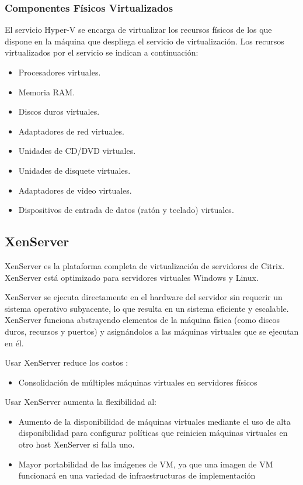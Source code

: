 \documentclass[preprint,12pt]{elsarticle}
\begin{document}
\subsubsection{\textbf{Componentes Físicos Virtualizados}}
El servicio Hyper-V se encarga de virtualizar los recursos físicos de los que dispone en la máquina que despliega
el servicio de virtualización.
Los recursos virtualizados por el servicio se indican a continuación:
\begin{itemize}
\item Procesadores virtuales.
\item Memoria RAM.
\item Discos duros virtuales.
\item Adaptadores de red virtuales.
\item Unidades de CD/DVD virtuales.
\item Unidades de disquete virtuales.
\item Adaptadores de video virtuales.
\item Dispositivos de entrada de datos (ratón y teclado) virtuales.
\end{itemize}
\cite{Hyperv2019}

\subsection {\textbf{XenServer}}
XenServer es la plataforma completa de virtualización de servidores de Citrix. XenServer está optimizado para servidores virtuales Windows y Linux.

XenServer se ejecuta directamente en el hardware del servidor sin requerir un sistema operativo subyacente, lo que resulta en un sistema eficiente y escalable. XenServer funciona abstrayendo elementos de la máquina física (como discos duros, recursos y puertos) y asignándolos a las máquinas virtuales que se ejecutan en él.

Usar XenServer reduce los costos :
\begin{itemize}
\item Consolidación de múltiples máquinas virtuales en servidores físicos
\end{itemize}
Usar XenServer aumenta la flexibilidad al:
\begin{itemize}
\item Aumento de la disponibilidad de máquinas virtuales mediante el uso de alta disponibilidad para configurar políticas que reinicien máquinas virtuales en otro host XenServer si falla uno.
\item Mayor portabilidad de las imágenes de VM, ya que una imagen de VM funcionará en una variedad de infraestructuras de implementación
\end{itemize}
\end{document}
